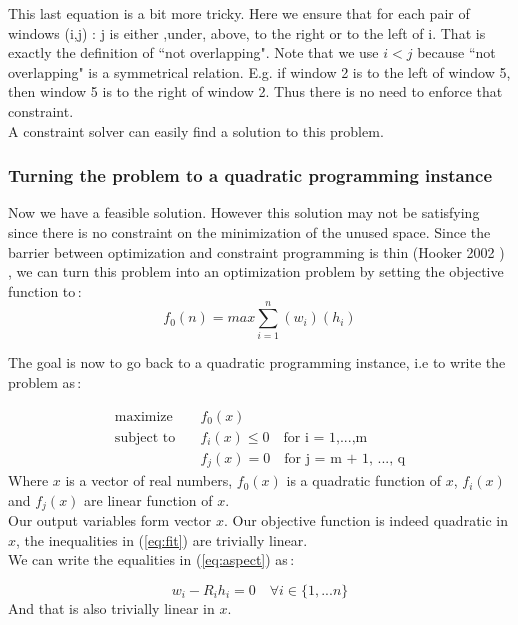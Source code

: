 \documentclass{acmtog}
\begin{document}
This last equation is a bit more tricky. Here we ensure that for each pair of windows (i,j) : j is either ,under, above, to the right or to the left of i. That is exactly the definition of ``not overlapping". Note that we use $i < j$ because ``not overlapping" is a symmetrical relation. E.g. if window 2 is to the left of window 5, then window 5 is to the right of window 2. Thus there is no need to enforce that constraint. \\
A constraint solver can easily find a solution to this problem.

\subsubsection{Turning the problem to a quadratic programming instance}

Now we have a feasible solution. However this solution may not be satisfying since there is no constraint on the minimization of the unused space. Since the barrier between optimization and constraint programming is thin (Hooker 2002 \cite{Hooker02}) , we can turn this problem into an optimization problem by setting the objective function  to\,:\\
\begin{equation}
f_0(n) = max \sum_{i=1}^{n}{(w_i)(h_i)}
\label{eq:objective}
\end{equation}

The goal is now to go back to a quadratic programming instance, i.e to write the problem as\,:

\begin{equation}
\begin{split}
\text{maximize} \quad& f_0(x) \\
\text{subject to} \quad& f_i(x) \leq 0 \quad \text{for i = 1,...,m} \\
&f_j(x) = 0 \quad \text{for j = m + 1, ..., q}
\end{split}
\end{equation}
Where $x$ is a vector of real numbers, $f_0(x)$ is a quadratic function of $x$, $f_i(x)$  and $f_j(x)$ are linear function of $x$. \\
Our output variables form vector $x$.
Our objective function is indeed quadratic in $x$, the inequalities in (\ref{eq:fit}) are trivially linear. \\
We can write the equalities in (\ref{eq:aspect}) as\,:

\begin{equation}
w_i - R_ih_i = 0 \quad \forall  i \in  \{1, ... n\}
\label{eq:aspect2}
\end{equation}
And that is also trivially linear in $x$.\\
\end{document}
